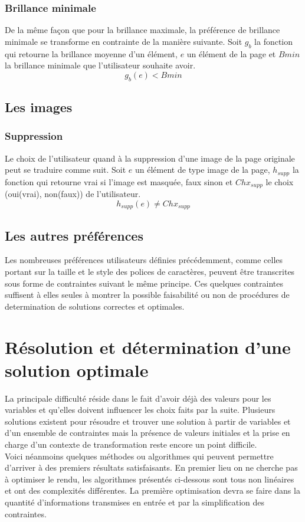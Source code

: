 \documentclass[french,a4paper]{report}
\begin{document}
{\subsubsection{Brillance minimale}
De la même façon que pour la brillance maximale, la préférence de brillance minimale se
transforme en contrainte de la manière suivante. Soit $g_{b}$ la fonction qui retourne la brillance moyenne d'un élément, $e$ un élément
de la page et $Bmin$ la brillance minimale que l'utilisateur souhaite avoir.
$$g_b(e) < Bmin$$
\subsection{Les images}
\subsubsection{Suppression}
Le choix de l'utilisateur quand à la suppression d'une image de la page
originale peut se traduire comme suit. Soit $e$ un élément de type image de la
page, $h_{supp}$ la fonction qui retourne vrai si l'image est masquée, faux
sinon et $Chx_{supp}$ le choix (oui(vrai), non(faux)) de l'utilisateur.
$$h_{supp}(e) \not= Chx_{supp}$$
\subsection{Les autres préférences}
Les nombreuses préférences utilisateurs définies précédemment, comme celles
portant sur la taille et le style des polices de caractères, peuvent être
transcrites sous forme de contraintes suivant le même principe. Ces quelques
contraintes suffisent à elles seules à montrer la possible faisabilité ou non de
procédures de determination de solutions correctes et optimales.\\
\section{Résolution et détermination d'une solution optimale}
La principale difficulté réside dans le fait d'avoir déjà des valeurs pour les
variables et qu'elles doivent influencer les choix faits par la suite. Plusieurs
solutions existent pour résoudre et trouver une solution à partir de variables
et d'un ensemble de contraintes mais la présence de valeurs initiales et la
prise en charge d'un contexte de transformation reste encore un point
difficile.\\
Voici néanmoins quelques méthodes ou algorithmes qui peuvent permettre d'arriver
à des premiers résultats satisfaisants.
En premier lieu on ne cherche pas à
optimiser le rendu, les algorithmes présentés ci-dessous sont tous non linéaires
et ont des complexités différentes. La première optimisation devra se faire dans
la quantité d'informations transmises en entrée et par la simplification des
contraintes.
}
\end{document}
